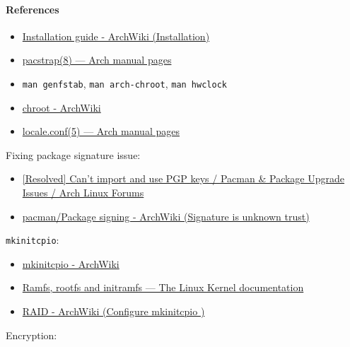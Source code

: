 \documentclass[12pt, a4paper]{article}
\begin{document}
  \paragraph{References}
  \begin{itemize}
    \item \href{https://wiki.archlinux.org/title/installation_guide#Installation}{Installation guide - ArchWiki (Installation)}
    \item \href{https://man.archlinux.org/man/pacstrap.8}{pacstrap(8) — Arch manual pages}
    \item \verb|man genfstab|, \verb|man arch-chroot|, \verb|man hwclock|
    \item \href{https://wiki.archlinux.org/title/Change_root}{chroot - ArchWiki}
    \item \href{https://man.archlinux.org/man/locale.conf.5}{locale.conf(5) — Arch manual pages}
  \end{itemize}
  Fixing package signature issue:
  \begin{itemize}
    \item \href{https://bbs.archlinux.org/viewtopic.php?id=289421}{[Resolved] Can't import and use PGP keys / Pacman \& Package Upgrade Issues / Arch Linux Forums}
    \item \href{https://wiki.archlinux.org/title/Pacman/Package_signing#Signature_is_unknown_trust}{pacman/Package signing - ArchWiki (Signature is unknown trust)}
  \end{itemize}
  \verb|mkinitcpio|:
  \begin{itemize}
    \item \href{https://wiki.archlinux.org/title/Mkinitcpio}{mkinitcpio - ArchWiki}
    \item \href{https://docs.kernel.org/filesystems/ramfs-rootfs-initramfs.html#what-is-rootfs}{Ramfs, rootfs and initramfs — The Linux Kernel  documentation}
    \item \href{https://wiki.archlinux.org/title/RAID#Configure_mkinitcpio}{RAID - ArchWiki (Configure mkinitcpio
    )}
  \end{itemize}
  Encryption:
\end{document}
